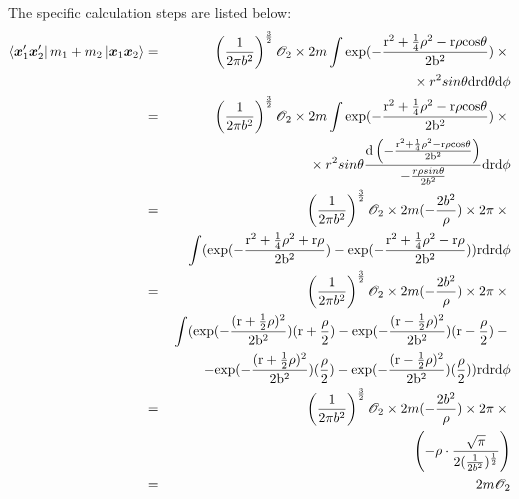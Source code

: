 \documentclass[11pt]{article}
\newcommand{\bm}[1]{\mbox{\boldmath{$#1$}}}
\begin{document}
\begin{enumerate}
\begin{enumerate}
The specific calculation steps are listed below:
\begin{eqnarray}
\bra{\bm{x}_{1}^\prime\bm{x}_{2}^\prime}m_{1}+m_{2}\ket{\bm{x}_{1}\bm{x}_{2}}&=&\left(\frac{1}{2\pi{}b^2}\right)^{\frac{3}{2}}
\mathscr{O}_2\times{}2m\int\rm{exp}(-\frac{r^2+\frac{1}{4}\rho^2-r{}\rho{}cos\theta}{2b^2})\times{}\nonumber\\
&&{}\times{}r^2sin\theta\rm{d}r\rm{d}\theta\rm{d}\phi\nonumber\\
&=&\left(\frac{1}{2\pi{}b^2}\right)^{\frac{3}{2}}\mathscr{O}_2\times{}2m
\int\rm{exp}(-\frac{r^2+\frac{1}{4}\rho^2-r{}\rho{}cos\theta}{2b^2})\times{}\nonumber\\
&&{}\times{}r^2sin\theta\frac{\rm{d}\left(-\frac{r^2+\frac{1}{4}\rho^2-r{}\rho{}cos\theta}{2b^2}\right)}
{-\frac{r{}\rho{}sin\theta}{2b^2}}
\rm{d}r\rm{d}\phi\nonumber\\
&=&\left(\frac{1}{2\pi{}b^2}\right)^{\frac{3}{2}}\mathscr{O}_2\times{}2m(-\frac{2b^2}{\rho})\times2\pi\times{}\nonumber\\
&&{}\int(\rm{exp}(-\frac{r^2+\frac{1}{4}\rho^2+r{}\rho}{2b^2})-\rm{exp}
(-\frac{r^2+\frac{1}{4}\rho^2-r{}\rho}{2b^2}))r\rm{d}r\rm{d}\phi\nonumber\\
&=&\left(\frac{1}{2\pi{}b^2}\right)^{\frac{3}{2}}\mathscr{O}_2\times{}2m(-\frac{2b^2}{\rho})\times2\pi\times{}\nonumber\\
&&{}\int(\rm{exp}(-\frac{(r+\frac{1}{2}\rho)^2}{2b^2})(r+\frac{\rho}{2})-\rm{exp}
(-\frac{(r-\frac{1}{2}\rho)^2}{2b^2})(r-\frac{\rho}{2})-{}\nonumber\\
&&-{}\rm{exp}(-\frac{(r+\frac{1}{2}\rho)^2}{2b^2})(\frac{\rho}{2})-
\rm{exp}(-\frac{(r-\frac{1}{2}\rho)^2}{2b^2})(\frac{\rho}{2}))
r\rm{d}r\rm{d}\phi\nonumber\\
&=&\left(\frac{1}{2\pi{}b^2}\right)^{\frac{3}{2}}\mathscr{O}_2\times{}2m(-\frac{2b^2}{\rho})\times{}2\pi\times{}\nonumber\\
&&\left(-\rho\cdot\frac{\sqrt{\pi}}{2(\frac{1}{2b^2})^{\frac{1}{2}}}\right)\nonumber\\
&=&2m\mathscr{O}_2
\end{eqnarray}
\end{enumerate}
\end{enumerate}
\end{document}
